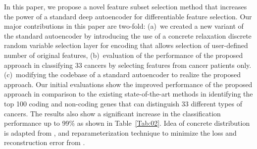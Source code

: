 \documentclass{bioinfo}
\begin{document}
In this paper, we propose a novel feature subset selection method that increases the power of a standard deep autoencoder for differentiable feature selection. 
Our major contributions in this paper are two-fold: (a)~we created a new variant of the standard autoencoder by introducing the use of a concrete relaxation discrete random variable selection layer for encoding that allows selection of user-defined number of original features, (b)~evaluation of the performance of the proposed approach in classifying 33 cancers by selecting features from cancer patients only. (c)~modifying the codebase of a standard autoencoder to realize the proposed approach. Our initial evaluations show the improved performance of the proposed approach in comparison to the existing state-of-the-art methods in identifying the top 100 coding and non-coding genes that can distinguish 33 different types of cancers.
The results also show a significant increase in the classification performance up to 99\% as shown in Table~\ref{Tab:02}.
Idea of concrete distribution is adapted from \citep{maddison2016concrete, kingma2013auto}, and reparameterization technique to minimize the loss and reconstruction error from \citep{abid2019concrete}.
\end{document}
